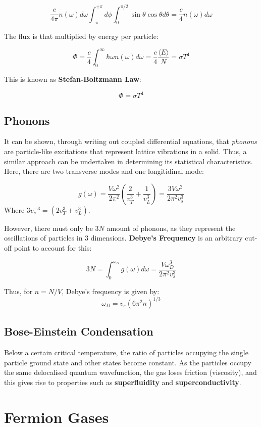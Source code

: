 \documentclass[12pt]{article}
\begin{document}
\[\frac{c}{4\pi}n(\omega)d\omega\int^{+\pi}_{-\pi}d\phi\int^{\pi/2}_0\sin\theta\cos\theta d\theta = \frac{c}{4}n(\omega)d\omega\]

The flux is that multiplied by energy per particle:

\[\Phi = \frac{c}{4}\int^\infty_0 \hbar \omega n(\omega) d\omega = \frac{c}{4}\frac{\langle E \rangle}{N}=\sigma T^4\]

This is known as \textbf{Stefan-Boltzmann Law}:

\[\boxed{\Phi = \sigma T^4}\]

\subsection{Phonons}

It can be shown, through writing out coupled differential equations, that \textit{phonons} are particle-like excitations that represent lattice vibrations in a solid. Thus, a similar approach can be undertaken in determining its statistical characteristics. Here, there are two transverse modes and one longitidinal mode:

\[g(\omega) = \frac{V\omega^2}{2\pi^2}\left(\frac{2}{v_T^3}+\frac{1}{v_L^3}\right) = \frac{3V\omega^2}{2\pi^2v^3_s}\]
Where $3v_s^{-3} = (2v_T^3 +v_L^3)$.

However, there must only be $3N$ amount of phonons, as they represent the oscillations of particles in 3 dimensions. \textbf{Debye's Frequency} is an arbitrary cut-off point to account for this:

\[3N = \int^{\omega_D}_0 g(\omega)d\omega = \frac{V\omega^3_D}{2\pi^2v_s^3}\]

Thus, for $n = N/V$, Debye's frequency is given by:
\[\boxed{\omega_D = v_s(6\pi^2 n)^{1/3}}\]

\subsection{Bose-Einstein Condensation}
Below a certain critical temperature, the ratio of particles occupying the single particle ground state and other states become constant. As the particles occupy the same delocalised quantum wavefunction, the gas loses friction (viscosity), and this gives rise to properties such as \textbf{superfluidity} and \textbf{superconductivity}.

\section{Fermion Gases}
\end{document}

